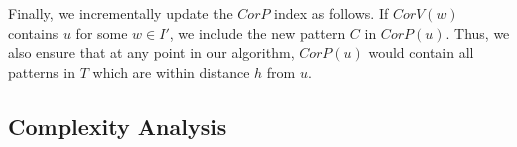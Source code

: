  Finally,
we incrementally update the $CorP$ index as follows. If $CorV(w)$ contains $u$ for some $w\in I'$, we include
the new pattern $C$ in $CorP(u)$. Thus, we also ensure that at any point in our algorithm, $CorP(u)$ would
contain all patterns in $T$ which are within distance $h$ from $u$.
%
%
\subsection{Complexity Analysis}
\label{sec:complexity_exact}
%



